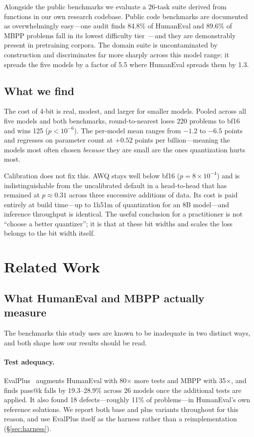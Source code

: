 \documentclass[11pt]{article}
\begin{document}
Alongside the public benchmarks we evaluate a 26-task suite derived from functions in
our own research codebase. Public code benchmarks are documented as overwhelmingly
easy---one audit finds 84.8\% of HumanEval and 89.6\% of MBPP problems fall in its
lowest difficulty tier~\citep{yadav2024pythonsaga}---and they are demonstrably present
in pretraining corpora. The domain suite is uncontaminated by construction and
discriminates far more sharply across this model range: it spreads the five models by a
factor of 5.5 where HumanEval spreads them by 1.3.

\subsection{What we find}

The cost of 4-bit is real, modest, and larger for smaller models. Pooled across all five
models and both benchmarks, round-to-nearest loses 220 problems to bf16 and wins 125
($p < 10^{-6}$). The per-model mean ranges from $-1.2$ to $-6.5$ points and regresses on
parameter count at $+0.52$ points per billion---meaning the models most often chosen
\emph{because} they are small are the ones quantization hurts most.

Calibration does not fix this. AWQ stays well below bf16 ($p = 8 \times 10^{-4}$) and is
indistinguishable from the uncalibrated default in a head-to-head that has remained at
$p \approx 0.31$ across three successive additions of data. Its cost is paid entirely at
build time---up to 1h51m of quantization for an 8B model---and inference throughput is
identical. The useful conclusion for a practitioner is not ``choose a better
quantizer''; it is that at these bit widths and scales the loss belongs to the bit width
itself.

\section{Related Work}
\label{sec:related}

\subsection{What HumanEval and MBPP actually measure}

The benchmarks this study uses are known to be inadequate in two distinct ways, and
both shape how our results should be read.

\paragraph{Test adequacy.} EvalPlus~\citep{liu2023evalplus} augments HumanEval with
80$\times$ more tests and MBPP with 35$\times$, and finds pass@k falls by 19.3--28.9\%
across 26 models once the additional tests are applied. It also found 18
defects---roughly 11\% of problems---in HumanEval's own reference solutions. We report
both base and plus variants throughout for this reason, and use EvalPlus itself as the
harness rather than a reimplementation (\S\ref{sec:harness}).
\end{document}
